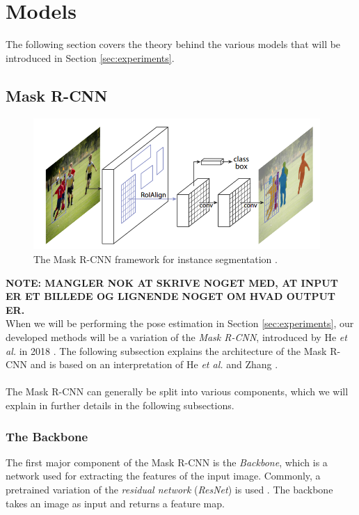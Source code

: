 \documentclass[./main.tex]{subfiles}
\begin{document}
\section{Models}
The following section covers the theory behind the various models that will be introduced in Section \ref{sec:experiments}.

\subsection{Mask R-CNN}
\begin{figure}[htbp]
    \centering
    \includegraphics[height=5cm]{./entities/mask_rcnn.PNG}
    \caption{The Mask R-CNN framework for instance segmentation \cite{https://doi.org/10.48550/arxiv.1703.06870}.}
    \label{fig:mask_rcnn}
\end{figure}
\textbf{NOTE: MANGLER NOK AT SKRIVE NOGET MED, AT INPUT ER ET BILLEDE OG LIGNENDE NOGET OM HVAD OUTPUT ER.} \\
\noindent When we will be performing the pose estimation in Section \ref{sec:experiments}, our developed methods will be a variation of the \textit{Mask R-CNN}, introduced by He \textit{et al.} in 2018 \cite{https://doi.org/10.48550/arxiv.1703.06870}. The following subsection explains the architecture of the Mask R-CNN and is based on an interpretation of He \textit{et al.} \cite{https://doi.org/10.48550/arxiv.1703.06870} and Zhang \cite{mask_rcnn_explained}.
\\
\\
The Mask R-CNN can generally be split into various components, which we will explain in further details in the following subsections.

\subsubsection{The Backbone}
The first major component of the Mask R-CNN is the \textit{Backbone}, which is a network used for extracting the features of the input image. Commonly, a pretrained variation of the \textit{residual network} (\textit{ResNet}) is used \cite{https://doi.org/10.48550/arxiv.1512.03385}. The backbone takes an image as input and returns a feature map.
\end{document}

